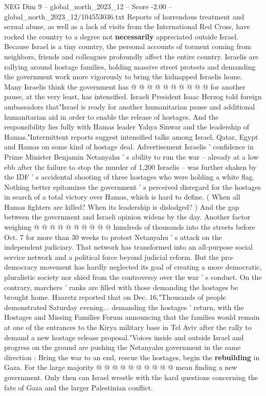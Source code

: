 \begin{textsample}{NEG Dim 9 – global\_north\_2023\_12 – Score -2.00 – global\_north\_2023\_12/104553036.txt}
Reports of horrendous treatment and sexual abuse, as well as a lack of visits from the International Red Cross, have rocked the country to a degree not \textbf{necessarily} appreciated outside Israel.
Because Israel is a tiny country, the personal accounts of torment coming from neighbors, friends and colleagues profoundly affect the entire country.
Israelis are rallying around hostage families, holding massive street protests and demanding the government work more vigorously to bring the kidnapped Israelis home.
Many Israelis think the government has @ @ @ @ @ @ @ @ @ @ for another pause, at the very least, has intensified.
Israeli President Isaac Herzog told foreign ambassadors that"Israel is ready for another humanitarian pause and additional humanitarian aid in order to enable the release of hostages.
And the responsibility lies fully with Hamas leader Yahya Sinwar and the leadership of Hamas."Intermittent reports suggest intensified talks among Israel, Qatar, Egypt and Hamas on some kind of hostage deal.
Advertisement Israelis ' confidence in Prime Minister Benjamin Netanyahu ' s ability to run the war -- already at a low ebb after the failure to stop the murder of 1,200 Israelis -- was further shaken by the IDF ' s accidental shooting of three hostages who were holding a white flag.
Nothing better epitomizes the government ' s perceived disregard for the hostages in search of a total victory over Hamas, which is hard to define. ( When all Hamas fighters are killed?
When its leadership is dislodged? ) And the gap between the government and Israeli opinion widens by the day.
Another factor weighing @ @ @ @ @ @ @ @ @ @ hundreds of thousands into the streets before Oct. 7 for more than 30 weeks to protest Netanyahu ' s attack on the independent judiciary.
That network has transformed into an all-purpose social service network and a political force beyond judicial reform.
But the pro-democracy movement has hardly neglected its goal of creating a more democratic, pluralistic society nor shied from the controversy over the war ' s conduct.
On the contrary, marchers ' ranks are filled with those demanding the hostages be brought home.
Haaretz reported that on Dec. 16,"Thousands of people demonstrated Saturday evening... demanding the hostages ' return, with the Hostages and Missing Families Forum announcing that the families would remain at one of the entrances to the Kirya military base in Tel Aviv after the rally to demand a new hostage release proposal."Voices inside and outside Israel and progress on the ground are pushing the Netanyahu government in the same direction : Bring the war to an end, rescue the hostages, begin the \textbf{rebuilding} in Gaza.
For the large majority @ @ @ @ @ @ @ @ @ @ mean finding a new government.
Only then can Israel wrestle with the hard questions concerning the fate of Gaza and the larger Palestinian conflict.

\end{textsample}
